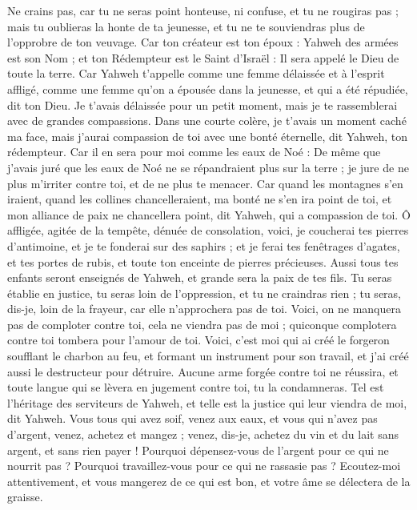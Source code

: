 \begin{multicols}{2}
Ne crains pas, car tu ne seras point honteuse, ni confuse, et tu ne rougiras pas ; mais tu oublieras la honte de ta jeunesse, et tu ne te souviendras plus de l'opprobre de ton veuvage.
Car ton créateur est ton époux : Yahweh des armées est son Nom ; et ton Rédempteur est le Saint d'Israël : Il sera appelé le Dieu de toute la terre.
Car Yahweh t'appelle comme une femme délaissée et à l'esprit affligé, comme une femme qu'on a épousée dans la jeunesse, et qui a été répudiée, dit ton Dieu.
Je t'avais délaissée pour un petit moment, mais je te rassemblerai avec de grandes compassions.
Dans une courte colère, je t'avais un moment caché ma face, mais j'aurai compassion de toi avec une bonté éternelle, dit Yahweh, ton rédempteur.
Car il en sera pour moi comme les eaux de Noé : De même que j'avais juré que les eaux de Noé ne se répandraient plus sur la terre ; je jure de ne plus m'irriter contre toi, et de ne plus te menacer.
Car quand les montagnes s'en iraient, quand les collines chancelleraient, ma bonté ne s'en ira point de toi, et mon alliance de paix ne chancellera point, dit Yahweh, qui a compassion de toi.
Ô affligée, agitée de la tempête, dénuée de consolation, voici, je coucherai tes pierres d'antimoine, et je te fonderai sur des saphirs ;
et je ferai tes fenêtrages d'agates, et tes portes de rubis, et toute ton enceinte de pierres précieuses.
Aussi tous tes enfants seront enseignés de Yahweh, et grande sera la paix de tes fils.
Tu seras établie en justice, tu seras loin de l'oppression, et tu ne craindras rien ; tu seras, dis-je, loin de la frayeur, car elle n'approchera pas de toi.
Voici, on ne manquera pas de comploter contre toi, cela ne viendra pas de moi ; quiconque complotera contre toi tombera pour l'amour de toi.
Voici, c'est moi qui ai créé le forgeron soufflant le charbon au feu, et formant un instrument pour son travail, et j'ai créé aussi le destructeur pour détruire.
Aucune arme forgée contre toi ne réussira, et toute langue qui se lèvera en jugement contre toi, tu la condamneras. Tel est l'héritage des serviteurs de Yahweh, et telle est la justice qui leur viendra de moi, dit Yahweh.
\VerseOne{}Vous tous qui avez soif, venez aux eaux, et vous qui n'avez pas d'argent, venez, achetez et mangez ; venez, dis-je, achetez du vin et du lait sans argent, et sans rien payer !
Pourquoi dépensez-vous de l'argent pour ce qui ne nourrit pas ? Pourquoi travaillez-vous pour ce qui ne rassasie pas ? Ecoutez-moi attentivement, et vous mangerez de ce qui est bon, et votre âme se délectera de la graisse.

\end{multicols}

